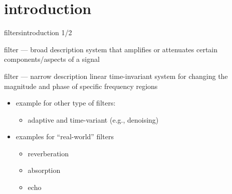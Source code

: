 


\subtitle{Part 15: Digital Filters I}


	

\section[intro]{introduction}
	\begin{frame}{filters}{introduction 1/2}
        \begin{block}{filter --- broad description}
            system that amplifies or attenuates certain components/aspects of a signal
        \end{block}
        \pause
        \bigskip
        \begin{block}{filter --- narrow description}
            linear time-invariant system for changing the magnitude and phase of specific frequency regions            
        \end{block}
        \pause
        \bigskip
        \begin{itemize}
            \item   example for other type of filters:
                \begin{itemize}
                    \item	adaptive  and time-variant (e.g., denoising)
                \end{itemize}
            \item	examples for ``real-world'' filters
                \begin{itemize}
                    \item	reverberation
                    \item	absorption
                    \item	echo
                \end{itemize}
        \end{itemize}
	\end{frame}

